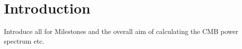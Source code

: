 \section{Introduction}\label{sec:introduction}

Introduce all for Milestones and the overall aim of calculating the CMB power spectrum etc. 

